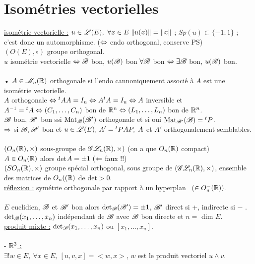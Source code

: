 \documentclass[12 pt]{exampleclass}
\begin{document}
\section{Isométries vectorielles}
\underline{isométrie vectorielle :} $u\in\mathscr{L}(E), \ \forall x\in E \; \|u(x)\|= \|x\|$ ; $Sp(u)\subset\{-1;1\}$ ; c'est donc un automorphisme. \qquad ($\Leftrightarrow$ endo orthogonal, conserve PS)\\
$(O(E),\circ)$ groupe orthogonal.\\
$u$ isométrie vectorielle $\Leftrightarrow \mathscr{B}$ bon, $u(\mathscr{B})$ bon $\forall \mathscr{B}$ bon $\Leftrightarrow \exists \mathscr{B}$ bon, $u(\mathscr{B})$ bon.\\
\text{}\\
• $A\in \mathscr{M}_n(\mathbb{R})$ orthogonale si l'endo cannoniquement associé à $A$ est une isométrie vectorielle.\\
$A$ orthogonale $\Leftrightarrow {}^tAA=I_n \Leftrightarrow A{}^tA=I_n \Leftrightarrow A$ inversible et $A^{-1} ={}^tA \Leftrightarrow (C_1,\dots,C_n)$ bon de $\mathbb{R}^n \Leftrightarrow (L_1,\dots,L_n)$ bon de $\mathbb{R}^n$.\\
$\mathscr{B}$ bon, $\mathscr{B}'$ bon ssi $\text{Mat}_{\mathscr{B}}(\mathscr{B}')$ orthogonale et si oui $\text{Mat}_{\mathscr{B}'}(\mathscr{B}) = {}^tP$.\\
$\Rightarrow$ si $\mathscr{B}, \mathscr{B}'$ bon et $u\in\mathscr{L}(E), \, A'={}^tPAP, \; A$ et $A'$ orthogonalement semblables.\\
\text{}\\
$(O_n(\mathbb{R}),\times)$ sous-groupe de $\mathscr{G}\mathscr{L}_n(\mathbb{R}),\times)$ \qquad (on a que $O_n(\mathbb{R})$ compact)\\
$A\in O_n(\mathbb{R})$ alors det$A = \pm 1 \ (\Leftarrow$ faux !!)\\
$(SO_n(\mathbb{R}), \times)$ groupe spécial orthogonal, sous groupe de $(\mathscr{G}\mathscr{L}_n(\mathbb{R}),\times)$, ensemble des matrices de $O_n((\mathbb{R})$ de det$>0$.\\
\underline{réflexion :} symétrie orthogonale par rapport à un hyperplan \ ($\in O_n^-(\mathbb{R}))$.\\
\text{}\\
$E$ euclidien, $\mathscr{B}$ et $\mathscr{B}'$ bon alors $\text{det}_{\mathscr{B}}(\mathscr{B}') = \pm 1$, $\mathscr{B}'$ direct si +, indirecte si $-$ .\\
$\text{det}_{\mathscr{B}} (x_1,\dots,x_n)$ indépendant de $\mathscr{B}$ avec $\mathscr{B}$ bon directe et $n=$ dim $E$.\\
\underline{produit mixte :} $\text{det}_{\mathscr{B}}(x_1,\dots,x_n)$ ou $[x_1,\dots,x_n]$.\\
\text{}\\
- \underline{$\mathbb{R}^3$ :}\\
$\exists! w\in E, \ \forall x\in E, \ [u,v,x]=<w,x>$, $w$ est le produit vectoriel $u\land v$.\\
\end{document}
